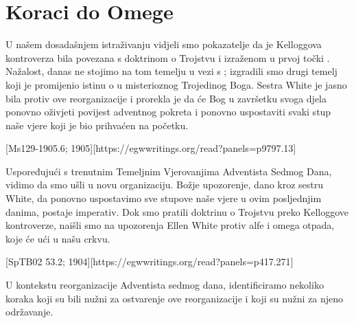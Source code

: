 \chapter{Koraci do Omege}

U našem dosadašnjem istraživanju vidjeli smo pokazatelje da je Kelloggova kontroverza bila povezana s doktrinom o Trojstvu i  izraženom u prvoj točki . Nažalost, danas ne stojimo na tom temelju u vezi s ; izgradili smo drugi temelj koji je promijenio istinu o  u misterioznog Trojedinog Boga. Sestra White je jasno bila protiv ove reorganizacije i prorekla je da će Bog u završetku svoga djela ponovno oživjeti povijest adventnog pokreta i ponovno uspostaviti svaki stup naše vjere koji je bio prihvaćen na početku.

[Ms129-1905.6; 1905][https://egwwritings.org/read?panels=p9797.13]

Uspoređujući  s trenutnim Temeljnim Vjerovanjima Adventista Sedmog Dana, vidimo da smo ušli u novu organizaciju. Božje upozorenje, dano kroz sestru White, da ponovno uspostavimo sve stupove naše vjere u ovim posljednjim danima, postaje imperativ. Dok smo pratili doktrinu o Trojstvu preko Kelloggove kontroverze, naišli smo na upozorenja Ellen White protiv alfe i omega otpada, koje će ući u našu crkvu.

[SpTB02 53.2; 1904][https://egwwritings.org/read?panels=p417.271]

U kontekstu reorganizacije Adventista sedmog dana, identificiramo nekoliko koraka koji su bili nužni za ostvarenje ove reorganizacije i koji su nužni za njeno održavanje.

